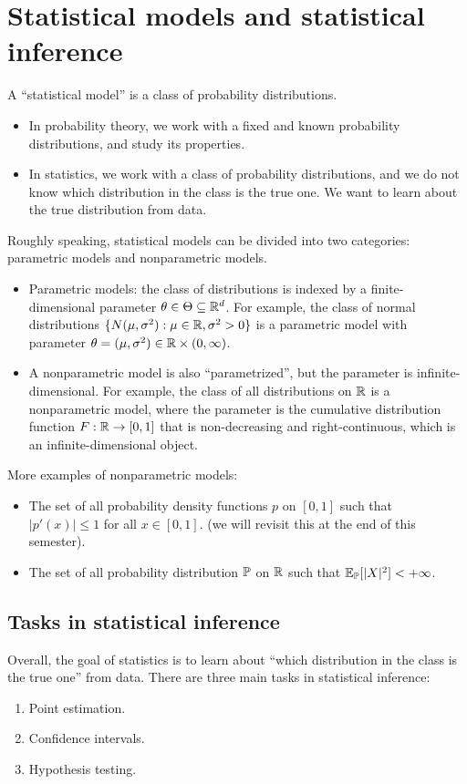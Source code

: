 \documentclass[11pt,letterpaper]{article}
\numberwithin{theorem}{lecture}
\numberwithin{proposition}{lecture}
\numberwithin{lemma}{lecture}
\numberwithin{claim}{lecture}
\numberwithin{corollary}{lecture}
\numberwithin{definition}{lecture}
\numberwithin{conjecture}{lecture}
\numberwithin{remark}{lecture}
\numberwithin{example}{lecture}
\numberwithin{equation}{lecture}
\begin{document}
\section{Statistical models and statistical inference}
A ``statistical model'' is a class of probability distributions.
\begin{itemize}
  \item In probability theory, we work with a fixed and known probability distributions, and study its properties.
  \item In statistics, we work with a class of probability distributions, and we do not know which distribution in the class is the true one. We want to learn about the true distribution from data.
\end{itemize}
Roughly speaking, statistical models can be divided into two categories: parametric models and nonparametric models.
\begin{itemize}
  \item Parametric models: the class of distributions is indexed by a finite-dimensional parameter $\theta \in \Theta \subseteq \mathbb{R}^d$. For example, the class of normal distributions $\{N(\mu, \sigma^2): \mu \in \mathbb{R}, \sigma^2 > 0\}$ is a parametric model with parameter $\theta = (\mu, \sigma^2) \in \mathbb{R} \times (0, \infty)$.
  \item A nonparametric model is also ``parametrized'', but the parameter is infinite-dimensional. For example, the class of all distributions on $\mathbb{R}$ is a nonparametric model, where the parameter is the cumulative distribution function $F: \mathbb{R} \to [0,1]$ that is non-decreasing and right-continuous, which is an infinite-dimensional object.
\end{itemize}
More examples of nonparametric models:
\begin{itemize}
\item The set of all probability density functions $p$ on $[0, 1]$ such that $|p' (x)| \leq 1$ for all $x \in [0, 1]$. (we will revisit this at the end of this semester).
\item The set of all probability distribution ${\mathbb{P}}$ on $\mathbb{R}$ such that ${\mathbb{E}}_{{\mathbb{P}}}[|X|^2] < + \infty$.
\end{itemize}

\subsection{Tasks in statistical inference}
Overall, the goal of statistics is to learn about ``which distribution in the class is the true one'' from data. There are three main tasks in statistical inference:
\begin{enumerate}
  \item Point estimation.
  \item Confidence intervals.
  \item Hypothesis testing.
\end{enumerate}
\end{document}
